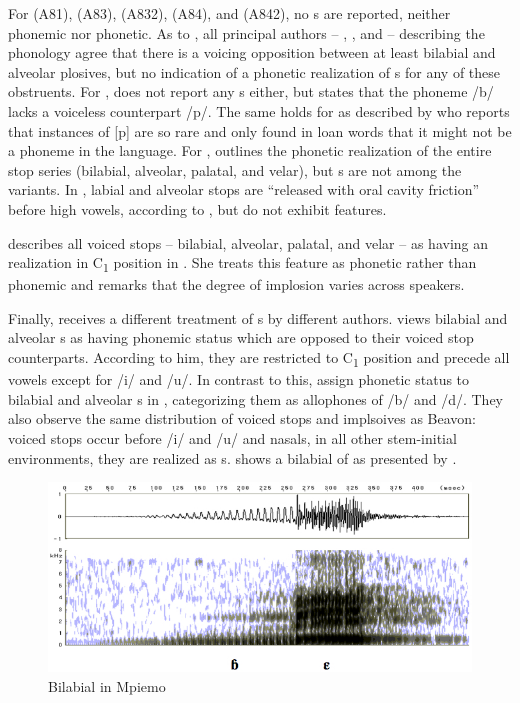 \documentclass[output=paper,modfonts,nonflat,
colorlinks, citecolor=brown,
draftmode,
]{langsci/langscibook}
\begin{document}
For  (A81),  (A83),  (A832),  (A84), and  (A842), no s are reported, neither phonemic nor phonetic.   As to , all principal authors -- \citet{Lemb1974}, \citet{Dieu1976}, and \citet{Yemmene2004} -- describing the phonology agree that there is a voicing opposition between at least bilabial and alveolar plosives, but no indication of a phonetic realization of s for any of these obstruents.  For , \citet{Heath2003} does not report any s either, but states that the phoneme /b/ lacks a voiceless counterpart /p/. The same holds for  as described by \citet{Henson2007} who reports that instances of [p] are so rare and only found in loan words that it might not be a phoneme in the language. For , \citet{Beavon2006} outlines the phonetic realization of the entire stop series (bilabial, alveolar, palatal, and velar), but s are not among the variants. In , labial and alveolar stops are ``released with oral cavity friction'' before high vowels, according to \citet[134]{Beavon1983}, but do not exhibit  features.


\citet[147]{Cheucle2014} describes all voiced stops -- bilabial, alveolar, palatal, and velar -- as having an  realization in C\textsubscript{1} position in . She treats this feature as phonetic rather than phonemic and remarks that the degree of implosion varies across speakers.

Finally,  receives a different treatment of s by different authors.  \citet{Beavon1978} views bilabial and alveolar s as having phonemic status which are opposed to their voiced stop counterparts. According to him, they are restricted to C\textsubscript{1} position and precede all vowels except for /i/ and /u/. In contrast to this, \citet{Thornell2004} assign phonetic status to bilabial and alveolar s in , categorizing them as allophones of /b/ and /d/. They also observe the same distribution of voiced stops and implsoives as Beavon: voiced stops occur before /i/ and /u/ and nasals, in all other stem-initial environments, they are realized as s.  shows a bilabial  of  as presented by \citet[172]{Thornell2004}.

\begin{figure}
\caption{Bilabial  in Mpiemo} 
\label{fig:grimm:1}
\includegraphics[width=\textwidth]{figures/mpiemoB.jpg}
\end{figure}
\end{document}

